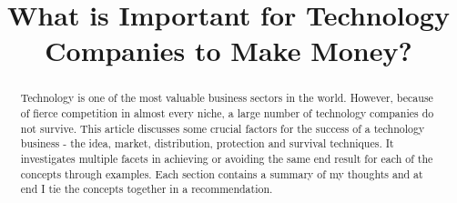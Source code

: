 \documentclass[twocolumn]{bmcart}%
\begin{document}
\begin{frontmatter}

\begin{fmbox}


\title{What is Important for Technology Companies to Make Money?}


\author[
   email={sh3g12@soton.ac.uk}   %
]{ }



\begin{abstractbox}

\begin{abstract} %

Technology is one of the most valuable business sectors in the world. However, because of fierce competition in almost every niche, a large number of technology companies do not survive. This article discusses some crucial factors for the success of a technology business - the idea, market, distribution, protection and survival techniques. It investigates multiple facets in achieving or avoiding the same end result for each of the concepts through examples. Each section contains a summary of my thoughts and at end I tie the concepts together in a recommendation.

\end{abstract}

\end{abstractbox}
%
\end{fmbox}%

\end{frontmatter}
\end{document}
